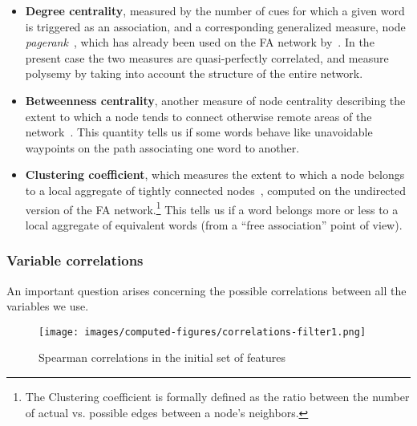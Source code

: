 \begin{itemize}
    \item \textbf{Degree centrality}, measured by the number of cues for which a given word is triggered as an association, and a corresponding generalized measure, node \emph{pagerank}~\citep{Page99}, which has already been used on the FA network by~\citet{Griffiths07}.
    In the present case the two measures are quasi-perfectly correlated, and measure polysemy by taking into account the structure of the entire network.
    \item \textbf{Betweenness centrality}, another measure of node centrality describing the extent to which a node tends to connect otherwise remote areas of the network~\citep{free:set}.
    This quantity tells us if some words behave like unavoidable waypoints on the path associating one word to another.
    \item \textbf{Clustering coefficient}, which measures the extent to which a node belongs to a local aggregate of tightly connected nodes~\cite{watt-coll}, computed on the undirected version of the FA network.\footnote{The Clustering coefficient is formally defined as the ratio between the number of actual vs. possible edges between a node's neighbors.}
    This tells us if a word belongs more or less to a local aggregate of equivalent words (from a ``free association'' point of view).
\end{itemize}

\subsubsection{Variable correlations}

An important question arises concerning the possible correlations between all the variables we use.

\begin{figure}[!th]
    \centering
    \texttt{[image: images/computed-figures/correlations-filter1.png]}
    \caption{Spearman correlations in the initial set of features}
    \label{fig:feature-corrs-initial}
\end{figure}

